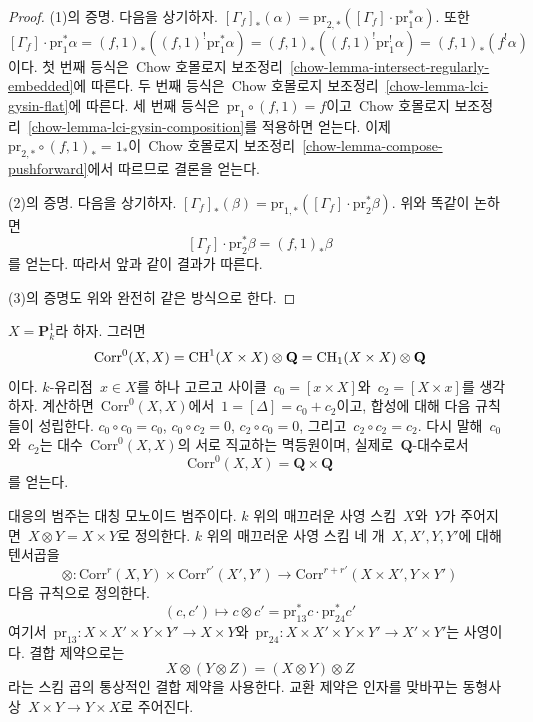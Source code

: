 \begin{proof}
(1)의 증명. 다음을 상기하자.
$[\Gamma_f]_*(\alpha) =
\text{pr}_{2, *}([\Gamma_f] \cdot \text{pr}_1^*\alpha)$.
또한
$$
[\Gamma_f] \cdot \text{pr}_1^*\alpha =
(f, 1)_*((f, 1)^! \text{pr}_1^*\alpha) =
(f, 1)_*((f, 1)^! \text{pr}_1^!\alpha) =
(f, 1)_*(f^!\alpha)
$$
이다. 첫 번째 등식은\  Chow 호몰로지 보조정리\ 
\ref{chow-lemma-intersect-regularly-embedded}에 따른다.
두 번째 등식은\  Chow 호몰로지 보조정리\ 
\ref{chow-lemma-lci-gysin-flat}에 따른다.
세 번째 등식은\  $\text{pr}_1 \circ (f, 1) = f$이고\  Chow 호몰로지
보조정리\  \ref{chow-lemma-lci-gysin-composition}를 적용하면 얻는다.
이제\  $\text{pr}_{2, *} \circ (f, 1)_* = 1_*$이\  Chow 호몰로지
보조정리\  \ref{chow-lemma-compose-pushforward}에서 따르므로 결론을 얻는다.

\medskip\noindent
(2)의 증명. 다음을 상기하자. $[\Gamma_f]_*(\beta) =
\text{pr}_{1, *}([\Gamma_f] \cdot \text{pr}_2^*\beta)$.
위와 똑같이 논하면
$$
[\Gamma_f] \cdot \text{pr}_2^*\beta = (f, 1)_*\beta
$$
를 얻는다. 따라서 앞과 같이 결과가 따른다.

\medskip\noindent
(3)의 증명도 위와 완전히 같은 방식으로 한다.
\end{proof}

\begin{example}
\label{example-decompose-P1}
$X = \mathbf{P}^1_k$라 하자. 그러면
$$
\text{Corr}^0(X, X) = \mathop{\mathrm{CH}}\nolimits^1(X \times X) \otimes \mathbf{Q} =
\mathop{\mathrm{CH}}\nolimits_1(X \times X) \otimes \mathbf{Q}
$$
이다. $k$-유리점\  $x \in X$를 하나 고르고 사이클\ 
$c_0 = [x \times X]$와\  $c_2 = [X \times x]$를 생각하자.
계산하면\  $\text{Corr}^0(X, X)$에서\ 
$1 = [\Delta] = c_0 + c_2$이고, 합성에 대해 다음 규칙들이 성립한다.
$c_0 \circ c_0 = c_0$,
$c_0 \circ c_2 = 0$,
$c_2 \circ c_0 = 0$, 그리고\ 
$c_2 \circ c_2 = c_2$.
다시 말해\  $c_0$와\  $c_2$는 대수\  $\text{Corr}^0(X, X)$의
서로 직교하는 멱등원이며, 실제로\  $\mathbf{Q}$-대수로서
$$
\text{Corr}^0(X, X) = \mathbf{Q} \times \mathbf{Q}
$$
를 얻는다.
\end{example}

\noindent
대응의 범주는 대칭 모노이드 범주이다. $k$ 위의 매끄러운 사영 스킴\ 
$X$와\  $Y$가 주어지면\  $X \otimes Y = X \times Y$로 정의한다.
$k$ 위의 매끄러운 사영 스킴 네 개\  $X, X', Y, Y'$에 대해 텐서곱을
$$
\otimes :
\text{Corr}^r(X, Y) \times \text{Corr}^{r'}(X', Y')
\longrightarrow
\text{Corr}^{r + r'}(X \times X', Y \times Y')
$$
다음 규칙으로 정의한다.
$$
(c, c') \longmapsto
c \otimes c' = \text{pr}_{13}^*c \cdot \text{pr}_{24}^*c'
$$
여기서\  $\text{pr}_{13} : X \times X' \times Y \times Y' \to X \times Y$와\ 
$\text{pr}_{24} : X \times X' \times Y \times Y' \to X' \times Y'$는
사영이다. 결합 제약으로는
$$
X \otimes (Y \otimes Z) = (X \otimes Y) \otimes Z
$$
라는 스킴 곱의 통상적인 결합 제약을 사용한다. 교환 제약은 인자를
맞바꾸는 동형사상\  $X \times Y \to Y \times X$로 주어진다.

